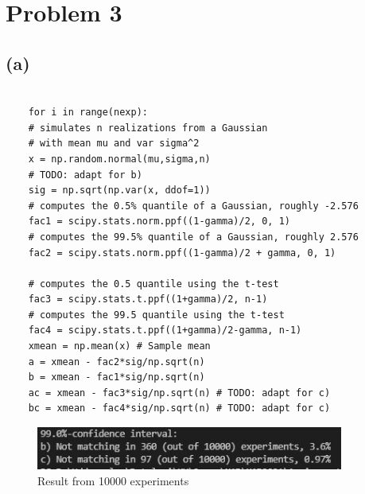 \section{Problem 3}
\subsection{(a)}

\begin{verbatim}

    for i in range(nexp):
    # simulates n realizations from a Gaussian 
    # with mean mu and var sigma^2
    x = np.random.normal(mu,sigma,n)
    # TODO: adapt for b)
    sig = np.sqrt(np.var(x, ddof=1))
    # computes the 0.5% quantile of a Gaussian, roughly -2.576  
    fac1 = scipy.stats.norm.ppf((1-gamma)/2, 0, 1) 
    # computes the 99.5% quantile of a Gaussian, roughly 2.576
    fac2 = scipy.stats.norm.ppf((1-gamma)/2 + gamma, 0, 1) 

    # computes the 0.5 quantile using the t-test
    fac3 = scipy.stats.t.ppf((1+gamma)/2, n-1)
    # computes the 99.5 quantile using the t-test
    fac4 = scipy.stats.t.ppf((1+gamma)/2-gamma, n-1)
    xmean = np.mean(x) # Sample mean
    a = xmean - fac2*sig/np.sqrt(n) 
    b = xmean - fac1*sig/np.sqrt(n) 
    ac = xmean - fac3*sig/np.sqrt(n) # TODO: adapt for c)
    bc = xmean - fac4*sig/np.sqrt(n) # TODO: adapt for c)
\end{verbatim}

\begin{figure}[H]
    \centering
    \includegraphics[width=0.9\textwidth]{Figures/result_of_confidence.JPG}
    \caption{Result from 10000 experiments}
\end{figure}
